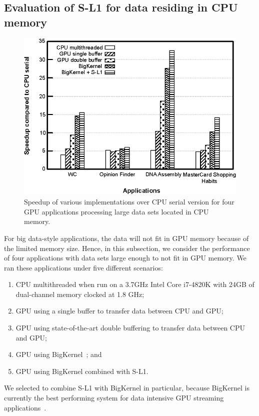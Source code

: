 \subsection{Evaluation of S-L1 for data residing in CPU memory}

\begin{figure}[t]
\center
\includegraphics[scale=0.80]{11bigkernelAndSl1.eps}
\vspace{-0.0cm}
\caption{\footnotesize\textnormal{Speedup of various implementations over CPU serial version for four GPU applications processing large data sets located in CPU memory.}}
\label{fig:bigkernelandsl1}
\end{figure}


For big data-style applications, the data will not fit in GPU memory because of the limited memory size. 
Hence, in this subsection, we consider the performance of four applications with data sets large enough to not fit in GPU memory.
We ran these applications under five different scenarios: 
\begin{enumerate}
\item CPU multithreaded when run on a 3.7GHz Intel Core i7-4820K with 24GB of dual-channel memory clocked at 1.8 GHz;
\item GPU using a single buffer to transfer data between CPU and GPU;
\item GPU using state-of-the-art double buffering to transfer data between CPU and GPU;
\item GPU using BigKernel~\cite{mokhtari2014bigkernel}; and
\item GPU using BigKernel combined with S-L1.
\end{enumerate} 
We selected to combine S-L1 with BigKernel in particular, because BigKernel is
currently the best performing system for data intensive GPU streaming
applications~\cite{mokhtari2014bigkernel}.

